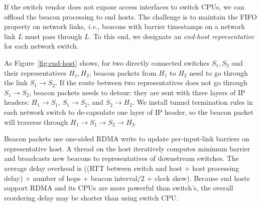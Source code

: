 If the switch vendor does not expose access interfaces to switch CPUs, we can offload the beacon processing to end hosts. The challenge is to maintain the FIFO property on network links, \emph{i.e.}, beacons with barrier timestamps on a network link $L$ must pass through $L$. To this end, we designate an \emph{end-host representative} for each network switch. %

As Figure~\ref{fig:end-host} shows, for two directly connected switches $S_1, S_2$ and their representatives $H_1, H_2$, beacon packets from $H_1$ to $H_2$ need to go through the link $S_1 \rightarrow S_2$. If the route between two representatives does not go through $S_1 \rightarrow S_2$, beacon packets needs to detour: they are sent with three layers of IP headers: $H_1 \rightarrow S_1$, $S_1 \rightarrow S_2$, and $S_2 \rightarrow H_2$.
We install tunnel termination rules in each network switch to de-capsulate one layer of IP header, so the beacon packet will traverse through $H_1 \rightarrow S_1 \rightarrow S_2 \rightarrow H_2$.

Beacon packets use one-sided RDMA write to update per-input-link barriers on representative host. A thread on the host iteratively computes minimum barrier and broadcasts new beacons to representatives of downstream switches.
The average delay overhead is ((RTT between switch and host + host processing delay) $\times$ number of hops + beacon interval/2 + clock skew). Because end hosts support RDMA and its CPUs are more powerful than switch's, the overall reordering delay may be shorter than using switch CPU.
